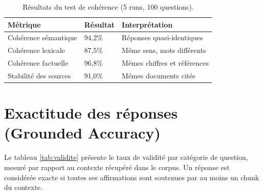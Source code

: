 \documentclass[12pt,a4paper,oneside]{report}
\begin{document}
\begin{table}[htbp]\centering

\begin{tabular}{@{}lll@{}}

\toprule

\textbf{M\'{e}trique} & \textbf{R\'{e}sultat} & \textbf{Interpr\'{e}tation} \\

\midrule

Coh\'{e}rence s\'{e}mantique & 94,2\% & R\'{e}ponses quasi-identiques \\

Coh\'{e}rence lexicale & 87,5\% & M\^{e}me sens, mots diff\'{e}rents \\

Coh\'{e}rence factuelle & 96,8\% & M\^{e}mes chiffres et r\'{e}f\'{e}rences \\

Stabilit\'{e} des sources & 91,0\% & M\^{e}mes documents cit\'{e}s \\

\bottomrule

\end{tabular}

\caption{R\'{e}sultats du test de coh\'{e}rence (5 runs, 100 questions).}\label{tab:coherence}

\end{table}



\section{Exactitude des r\'{e}ponses (Grounded Accuracy)}



Le tableau \ref{tab:validite} pr\'{e}sente le taux de validit\'{e} par cat\'{e}gorie de question, mesur\'{e} par rapport au contexte r\'{e}cup\'{e}r\'{e} dans le corpus. Un r\'{e}ponse est consid\'{e}r\'{e}e exacte si toutes ses affirmations sont soutenues par au moins un chunk du contexte.
\end{document}

